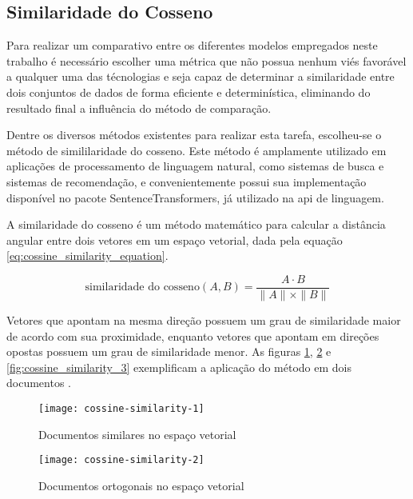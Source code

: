 \subsection{Similaridade do Cosseno}\label{subsec:cossine_similarity}

Para realizar um comparativo entre os diferentes modelos empregados neste trabalho é necessário escolher uma métrica que não possua nenhum viés favorável a qualquer uma das técnologias e seja capaz de determinar a similaridade entre dois conjuntos de dados de forma eficiente e determinística, eliminando do resultado final a influência do método de comparação.

Dentre os diversos métodos existentes para realizar esta tarefa, escolheu-se o método de simililaridade do cosseno. Este método é amplamente utilizado em aplicações de processamento de linguagem natural, como sistemas de busca e sistemas de recomendação, e convenientemente possui sua implementação disponível no pacote SentenceTransformers, já utilizado na \gls{api} de linguagem.

A similaridade do cosseno é um método matemático para calcular a distância angular entre dois vetores em um espaço vetorial, dada pela equação \ref{eq:cossine_similarity_equation}.

\begin{equation}
    \label{eq:cossine_similarity_equation}
    \text{similaridade do cosseno}(A, B) = \frac{A \cdot B}{\|A\| \times \|B\|}
\end{equation}

Vetores que apontam na mesma direção possuem um grau de similaridade maior de acordo com sua proximidade, enquanto vetores que apontam em direções opostas possuem um grau de similaridade menor. As figuras \ref{fig:cossine_similarity_1}, \ref{fig:cossine_similarity_2} e \ref{fig:cossine_similarity_3} exemplificam a aplicação do método em dois documentos \cite{YlberArtan2022}.

\begin{figure}[H]
    \caption{Documentos similares no espaço vetorial}
    \texttt{[image: cossine-similarity-1]}
    \label{fig:cossine_similarity_1}
\end{figure}

\begin{figure}[H]
    \caption{Documentos ortogonais no espaço vetorial}
    \texttt{[image: cossine-similarity-2]}
    \label{fig:cossine_similarity_2}
\end{figure}

